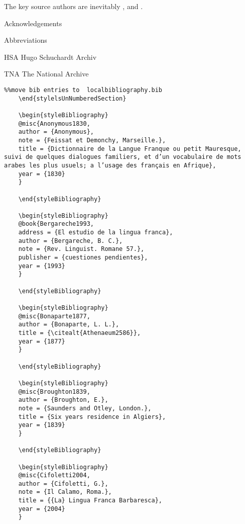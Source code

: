 \documentclass[output=paper]{langsci/langscibook}
\begin{document}
The key source authors are inevitably \citet{Haedo1612}, \citet{Broughton1839} \citet{Pananti1841} and \citet{Frank1850}.

\begin{stylelsUnNumberedSection}
	Acknowledgements
\end{stylelsUnNumberedSection}

\begin{stylelsUnNumberedSection}
	Abbreviations
\end{stylelsUnNumberedSection}

HSA  Hugo Schuchardt Archiv

TNA  The National Archive

\begin{stylelsUnNumberedSection}
	\begin{verbatim}%%move bib entries to  localbibliography.bib
	\end{stylelsUnNumberedSection}
	
	\begin{styleBibliography}
	@misc{Anonymous1830,
	author = {Anonymous},
	note = {Feissat et Demonchy, Marseille.},
	title = {Dictionnaire de la Langue Franque ou petit Mauresque, suivi de quelques dialogues familiers, et d’un vocabulaire de mots arabes les plus usuels; a l’usage des français en Afrique},
	year = {1830}
	}
	
	\end{styleBibliography}
	
	\begin{styleBibliography}
	@book{Bergareche1993,
	address = {El estudio de la lingua franca},
	author = {Bergareche, B. C.},
	note = {Rev. Linguist. Romane 57.},
	publisher = {cuestiones pendientes},
	year = {1993}
	}
	
	\end{styleBibliography}
	
	\begin{styleBibliography}
	@misc{Bonaparte1877,
	author = {Bonaparte, L. L.},
	title = {\citealt{Athenaeum2586}},
	year = {1877}
	}
	
	\end{styleBibliography}
	
	\begin{styleBibliography}
	@misc{Broughton1839,
	author = {Broughton, E.},
	note = {Saunders and Otley, London.},
	title = {Six years residence in Algiers},
	year = {1839}
	}
	
	\end{styleBibliography}
	
	\begin{styleBibliography}
	@misc{Cifoletti2004,
	author = {Cifoletti, G.},
	note = {Il Calamo, Roma.},
	title = {{La} Lingua Franca Barbaresca},
	year = {2004}
	}
	

\end{verbatim}
\end{stylelsUnNumberedSection}
\end{document}
